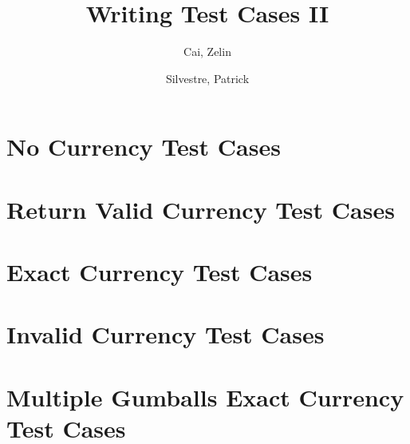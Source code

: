 \documentclass[10pt,letterpaper]{article}
\title{Writing Test Cases II}
\author{
	Cai, Zelin\\
	\and
	Silvestre, Patrick\\
}
\date{}
\begin{document}
\maketitle
\section{No Currency Test Cases}

\section{Return Valid Currency Test Cases}

\section{Exact Currency Test Cases}

\section{Invalid Currency Test Cases}

\section{Multiple Gumballs Exact Currency Test Cases}
\end{document}
